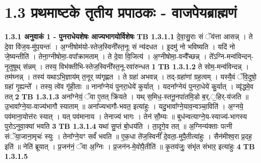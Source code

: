 \documentclass[17pt]{extarticle}
\begin{document}
     \section*{ 1.3     प्रथमाष्टके तृतीय प्रपाठकः - वाजपेयब्राह्मणं }
                \textbf{ 1.3.1     अनुवाकं   1 - पुनराधेयशेषः आज्यभागयोर्विशेषः} \newline
                                \textbf{ TB 1.3.1.1} \newline
                  दे॒वा॒सु॒राः सं ॅय॑त्ता आसन्न् । ते दे॒वा वि॑ज॒य-मु॑प॒यन्तः॑ । अ॒ग्नीषोम॑यो-स्तेज॒स्विनी᳚स्त॒नूः सं न्य॑दधत । इ॒दमु॑ नो भविष्यति । यदि॑ नो जे॒ष्यन्तीति॑ । तेना॒ग्नीषोमा॒-वपा᳚क्रामताम् । ते दे॒वा वि॒जित्य॑ । अ॒ग्नीषोमा॒-वन्वै᳚च्छन्न् । ते᳚ऽग्नि-मन्व॑विन्दन्-नृ॒तुषूथ् स॑न्नम् । तस्य॒ विभ॑क्तीभि-स्तेज॒स्विनी᳚स्त॒नू-रवा॑रुन्धत \textbf{ 1} \newline
                  \newline
                                \textbf{ TB 1.3.1.2} \newline
                  ते सोम॒-मन्व॑विन्दन्न् । तम॑घ्नन्न् । तस्य॑ यथाऽभि॒ज्ञाय॑म् त॒नूर् व्य॑गृह्णत । ते ग्रहा॑ अभवन्न् । तद्-ग्रहा॑णां ग्रह॒त्वम् । यस्यै॒वं ॅवि॒दुषो॒ ग्रहा॑ गृ॒ह्यन्ते᳚ । तस्य॒ त्वे॑व गृ॑ही॒ताः ॥ नाना᳚ग्नेयं पुनरा॒धेये॑ कुर्यात् । यदना᳚ग्नेयं पुनरा॒धेये॑ कु॒र्यात् । व्यृ॑द्धमे॒व तत् \textbf{ 2} \newline
                  \newline
                                \textbf{ TB 1.3.1.3} \newline
                  अना᳚ग्नेयं॒ ॅवा ए॒तत् क्रि॑यते । यथ् स॒मिध॒-स्तनू॒नपा॑तमि॒डो ब॒र्.॒हिर्-य॑जति ॥ उ॒भावा᳚ग्ने॒या-वाज्य॑भागौ स्याताम् ॥ अना᳚ज्यभागौ-भवत॒ इत्या॑हुः । यदु॒भावा᳚ग्ने॒याव॒न्वञ्चा॒विति॑ । अ॒ग्नये॒ पव॑माना॒योत्त॑रः स्यात् । यत् पव॑मानाय । तेनाज्य॑ भागः । तेन॑ सौ॒म्यः ॥ बुध॑न्वत्याग्ने॒य-स्याज्य॑-भागस्य पुरोऽनुवा॒क्या॑ भवति \textbf{ 3} \newline
                  \newline
                                \textbf{ TB 1.3.1.4} \newline
                  यथा॑ सु॒प्तं बो॒धय॑ति । ता॒दृगे॒व तत् ॥ अ॒ग्निन्य॑क्ताः पत्नी संॅया॒जाना॒मृचः॑ स्युः । तेना᳚ग्ने॒यꣳ सर्वं॑ भवति ॥ ए॒क॒धा ते॑ज॒स्विनीं᳚ दे॒वता॒-मुपै॒तीत्या॑हुः । सैन॑मीश्व॒रा प्र॒दह॒ इति॑ ॥ नेति॑ ब्रूयात् । प्र॒जन॑नं॒ ॅवा अ॒ग्निः । प्र॒जन॑न-मे॒वोपै॒तीति॑ ॥ कृ॒तय॑जुः॒ संभृ॑त संभार॒ इत्या॑हुः \textbf{ 4} \newline
                  \newline
                                \textbf{ TB 1.3.1.5} \newline
\end{document}
